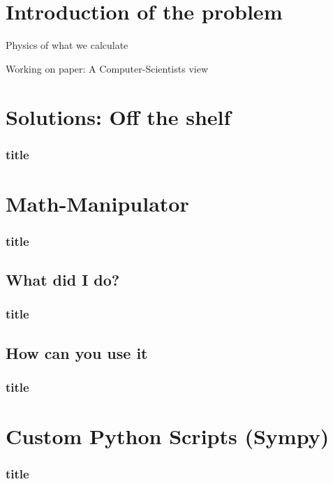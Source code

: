 
\section{Introduction of the problem}
    
    \begin{frame}{Physics of what we calculate}
    \end{frame}

    \begin{frame}{Working on paper: A Computer-Scientists view}
    \end{frame}

\section{Solutions: Off the shelf}
    \begin{frame}
        \frametitle{title}
    \end{frame}

\section{Math-Manipulator}
    \begin{frame}
        \frametitle{title}
    \end{frame}

\subsection{What did I do?}
    \begin{frame}
        \frametitle{title}
    \end{frame}

\subsection{How can you use it}
    \begin{frame}
        \frametitle{title}
    \end{frame}

\section{Custom Python Scripts (Sympy)}
    \begin{frame}
        \frametitle{title}
    \end{frame}